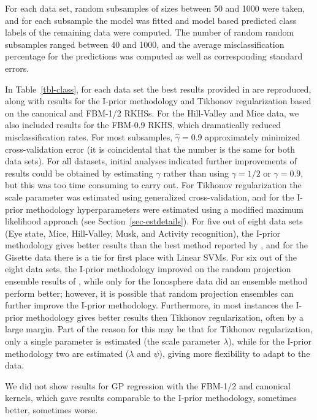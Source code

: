 \documentclass[preprint,12pt,authoryear]{elsarticle}
\begin{document}
For each data set, random subsamples of sizes between 50 and 1000 were taken, and for each subsample the model was fitted and model based predicted class labels of the remaining data were computed. The number of random random subsamples ranged between 40 and 1000, and the average misclassification percentage for the predictions was computed as well as corresponding standard errors. 

In Table~\ref{tbl-class}, for each data set the best results provided in \citet{cs17} are reproduced, along with results for the I-prior methodology and Tikhonov regularization based on the canonical and FBM-1/2 RKHSs. 
For the Hill-Valley and Mice data, we also included results for the FBM-0.9 RKHS, which dramatically reduced misclassification rates. For most subsamples, $\hat\gamma=0.9$ approximately minimized cross-validation error (it is coincidental that the number is the same for both data sets). For all datasets, initial analyses indicated further improvements of results could be obtained by estimating $\gamma$ rather than using $\gamma=1/2$ or $\gamma=0.9$, but this was too time consuming to carry out. 
For Tikhonov regularization the scale parameter was estimated using generalized cross-validation, and for the I-prior methodology hyperparameters were estimated using a modified maximum likelihood approach (see Section~\ref{sec-estdetails}).
For five out of eight data sets (Eye state, Mice, Hill-Valley, Musk, and Activity recognition), the I-prior methodology gives better results than the best method reported by \citeauthor{cs17}, and for the Gisette data there is a tie for first place with Linear SVMs. For six out of the eight data sets, the I-prior methodology improved on the random projection ensemble results of \citet{cs17}, while only for the Ionosphere data did an ensemble method perform better; however, it is possible that random projection ensembles can further improve the I-prior methodology.
Furthermore, in most instances the I-prior methodology gives better results then Tikhonov regularization, often by a large margin. Part of the reason for this may be that for Tikhonov regularization, only a single parameter is estimated (the scale parameter $\lambda$), while for the I-prior methodology two are estimated ($\lambda$ and $\psi$), giving more flexibility to adapt to the data. 


We did not show results for GP regression with the FBM-1/2 and canonical kernels, which gave results comparable to the I-prior methodology, sometimes better, sometimes worse. 
\end{document}
